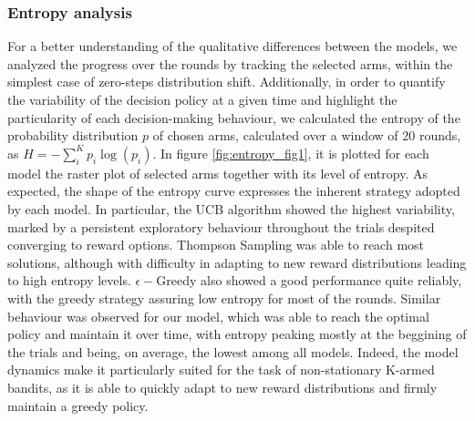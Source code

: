 \subsubsection{Entropy analysis}\label{sec:entropy}
\noindent For a better understanding of the qualitative differences between the models, we analyzed the progress over the rounds by tracking the selected arms, within the simplest case of zero-steps distribution shift.
Additionally, in order to quantify the variability of the decision policy at a given time and highlight the particularity of each decision-making behaviour, we calculated the entropy of the probability distribution $p$ of chosen arms, calculated over a window of 20 rounds, as $H=-\sum^{K}_{i} p_{i}\log(p_{i})$.
In figure \ref{fig:entropy_fig1}, it is plotted for each model the raster plot of selected arms together with its level of entropy. As expected, the shape of the entropy curve expresses the inherent strategy adopted by each model.
In particular, the UCB algorithm showed the highest variability, marked by a persistent exploratory behaviour throughout the trials despited converging to reward options. Thompson Sampling was able to reach most solutions, although with difficulty in adapting to new reward distributions
leading to high entropy levels.
$\epsilon-$Greedy also showed a good performance quite reliably, with the greedy strategy assuring low entropy for most of the rounds.
Similar behaviour was observed for our model, which was able to reach the optimal policy and maintain it over time, with entropy peaking mostly at the beggining of the trials and being, on average, the lowest among all models.
Indeed, the model dynamics make it particularly suited for the task of non-stationary K-armed bandits, as it is able to quickly adapt to new reward distributions and firmly maintain a greedy policy.

